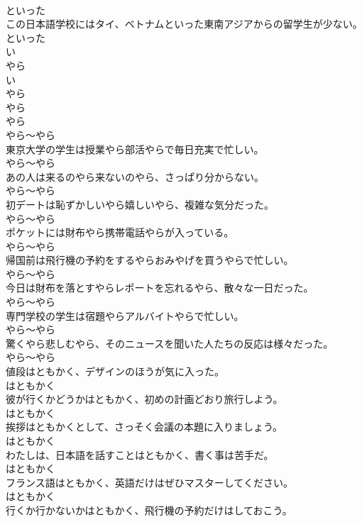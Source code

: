 \documentclass[8pt]{extreport}
\begin{document}
\begin{CJK}{UTF8}{min}
\\	といった
\\	この日本語学校にはタイ、ベトナムといった東南アジアからの留学生が少ない。	
\\	といった
\\	い
\\	やら 
\\	い
\\	やら 
\\	やら	
\\	やら 
\\	やら～やら
\\	東京大学の学生は授業やら部活やらで毎日充実で忙しい。	
\\	やら～やら
\\	あの人は来るのやら来ないのやら、さっぱり分からない。	
\\	やら～やら
\\	初デートは恥ずかしいやら嬉しいやら、複雑な気分だった。	
\\	やら～やら
\\	ポケットには財布やら携帯電話やらが入っている。	
\\	やら～やら
\\	帰国前は飛行機の予約をするやらおみやげを買うやらで忙しい。	
\\	やら～やら
\\	今日は財布を落とすやらレポートを忘れるやら、散々な一日だった。	
\\	やら～やら
\\	専門学校の学生は宿題やらアルバイトやらで忙しい。	
\\	やら～やら
\\	驚くやら悲しむやら、そのニュースを聞いた人たちの反応は様々だった。	
\\	やら～やら
\\	値段はともかく、デザインのほうが気に入った。	
\\	はともかく
\\	彼が行くかどうかはともかく、初めの計画どおり旅行しよう。	
\\	はともかく
\\	挨拶はともかくとして、さっそく会議の本題に入りましょう。	
\\	はともかく
\\	わたしは、日本語を話すことはともかく、書く事は苦手だ。	
\\	はともかく
\\	フランス語はともかく、英語だけはぜひマスターしてください。	
\\	はともかく
\\	行くか行かないかはともかく、飛行機の予約だけはしておこう。	

\end{CJK}
\end{document}
